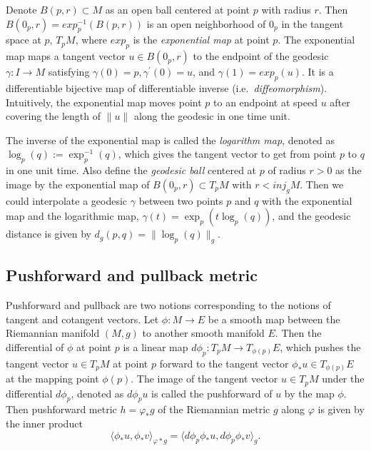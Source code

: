 \documentclass[11pt,a4paper,]{article}
\begin{document}
Denote \(B(p, r) \subset M\) as an open ball centered at point \(p\) with radius \(r\). Then \(B(0_p, r) = exp_p^{-1}(B(p,r))\) is an open neighborhood of \(0_p\) in the tangent space at \(p\), \(T_pM\), where \(exp_p\) is the \emph{exponential map} at point \(p\). The exponential map maps a tangent vector \(u \in B(0_p, r)\) to the endpoint of the geodesic \(\gamma: I \rightarrow M\) satisfying \(\gamma(0)=p, \gamma^{\prime}(0)=u\), and \(\gamma(1)=exp_p(u)\). It is a differentiable bijective map of differentiable inverse (i.e.~\emph{diffeomorphism}). Intuitively, the exponential map moves point \(p\) to an endpoint at speed \(u\) after covering the length of \(\|u\|\) along the geodesic in one time unit.

The inverse of the exponential map is called the \emph{logarithm map}, denoted as \(\log_p(q):= \exp^{-1}_p(q)\), which gives the tangent vector to get from point \(p\) to \(q\) in one unit time. Also define the \emph{geodesic ball} centered at \(p\) of radius \(r > 0\) as the image by the exponential map of \(B(0_p, r) \subset T_pM\) with \(r < \textit{inj}_gM\). Then we could interpolate a geodesic \(\gamma\) between two points \(p\) and \(q\) with the exponential map and the logarithmic map, \(\gamma(t) = \exp_p(t\log_p(q))\), and the geodesic distance is given by \(d_g(p,q) = \|\log_p(q)\|_g\).

\hypertarget{pushforward-and-pullback-metric}{%
\subsection{Pushforward and pullback metric}\label{pushforward-and-pullback-metric}}

Pushforward and pullback are two notions corresponding to the notions of tangent and cotangent vectors.
Let \(\phi: M \rightarrow E\) be a smooth map between the Riemannian manifold \((M,g)\) to another smooth manifold \(E\). Then the differential of \(\phi\) at point \(p\) is a linear map \(d\phi_p: T_pM \rightarrow T_{\phi (p)}E\), which pushes the tangent vector \(u \in T_pM\) at point \(p\) forward to the tangent vector \(\phi_*u \in T_{\phi (p)}E\) at the mapping point \(\phi(p)\).
The image of the tangent vector \(u \in T_pM\) under the differential \(d\phi_p\), denoted as \(d\phi_p u\) is called the pushforward of \(u\) by the map \(\phi\).
Then pushforward metric \(h=\varphi_*g\) of the Riemannian metric \(g\) along \(\varphi\) is given by the inner product
\[
\langle \phi_*u,\phi_*v \rangle_{\varphi*g} = \langle d\phi_p \phi_*u, d\phi_p \phi_*v \rangle_{g}.
\]
\end{document}
